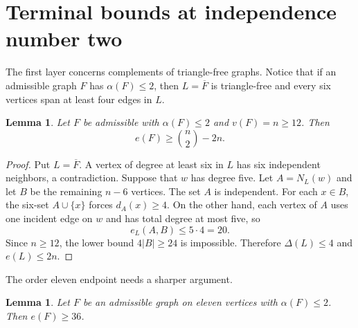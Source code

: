 \documentclass[11pt,reqno,a4paper]{amsart}
\newtheorem{lemma}[theorem]{Lemma}
\theoremstyle{definition}
\theoremstyle{remark}
\newcommand{\comp}[1]{\overline{#1}}
\begin{document}
\section{Terminal bounds at independence number two}\label{sec:terminal}

The first layer concerns complements of triangle-free graphs.  Notice that
if an admissible graph $F$ has $\alpha(F)\leq2$, then $L=\comp F$ is
triangle-free and every six vertices span at least four edges in $L$.

\begin{lemma}\label{lem:alpha2-large}
Let $F$ be admissible with $\alpha(F)\leq2$ and $v(F)=n\geq12$.  Then
\[
  e(F)\geq\binom n2-2n.
\]
\end{lemma}

\begin{proof}
Put $L=\comp F$.  A vertex of degree at least six in $L$ has six independent
neighbors, a contradiction.  Suppose that $w$ has degree five.  Let
$A=N_L(w)$ and let $B$ be the remaining $n-6$ vertices.  The set $A$ is
independent.  For each $x\in B$, the six-set $A\cup\{x\}$ forces
$d_A(x)\geq4$.  On the other hand, each vertex of $A$ uses one incident edge
on $w$ and has total degree at most five, so
\[
  e_L(A,B)\leq5\cdot4=20.
\]
Since $n\geq12$, the lower bound $4|B|\geq24$ is impossible.  Therefore
$\Delta(L)\leq4$ and $e(L)\leq2n$.
\end{proof}

The order eleven endpoint needs a sharper argument.

\begin{lemma}\label{lem:alpha2-eleven}
Let $F$ be an admissible graph on eleven vertices with $\alpha(F)\leq2$.
Then $e(F)\geq36$.
\end{lemma}
\end{document}
